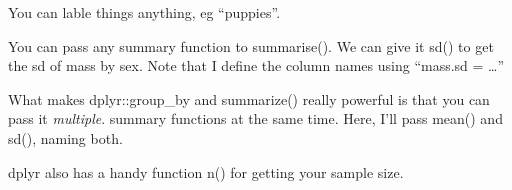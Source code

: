 \documentclass[]{book}
\newenvironment{Shaded}{\begin{snugshade}}{\end{snugshade}}
\newcommand{\KeywordTok}[1]{\textcolor[rgb]{0.13,0.29,0.53}{\textbf{#1}}}
\newcommand{\DataTypeTok}[1]{\textcolor[rgb]{0.13,0.29,0.53}{#1}}
\newcommand{\StringTok}[1]{\textcolor[rgb]{0.31,0.60,0.02}{#1}}
\newcommand{\OperatorTok}[1]{\textcolor[rgb]{0.81,0.36,0.00}{\textbf{#1}}}
\newcommand{\NormalTok}[1]{#1}
\theoremstyle{definition}
\theoremstyle{definition}
\theoremstyle{definition}
\theoremstyle{remark}
\begin{document}
You can lable things anything, eg ``puppies''.

\begin{Shaded}
\end{Shaded}

You can pass any summary function to summarise(). We can give it sd() to
get the sd of mass by sex. Note that I define the column names using
``mass.sd = \ldots{}''

\begin{Shaded}
\end{Shaded}

What makes dplyr::group\_by and summarize() really powerful is that you
can pass it \emph{multiple}. summary functions at the same time. Here,
I'll pass mean() and sd(), naming both.

\begin{Shaded}
\end{Shaded}

dplyr also has a handy function n() for getting your sample size.

\begin{Shaded}
\end{Shaded}
\end{document}
